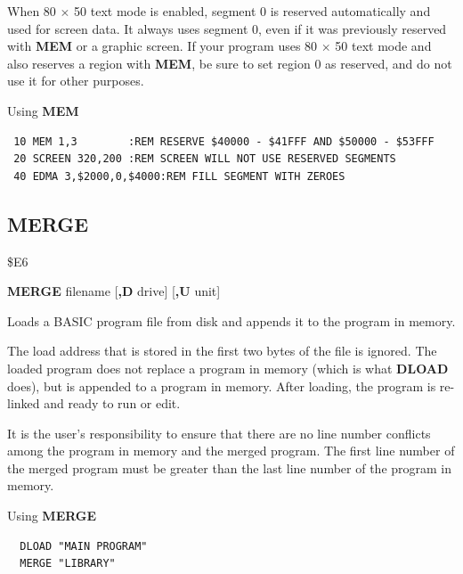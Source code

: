 \begin{description}[leftmargin=2cm,style=nextline]
                 When 80 $\times$ 50 text mode is enabled, segment 0 is reserved
                 automatically and used for screen data. It always uses
                 segment 0, even if it was previously reserved with {\bf MEM}
                 or a graphic screen. If your program uses 80 $\times$ 50 text
                 mode and also reserves a region with {\bf MEM}, be sure to
                 set region 0 as reserved, and do not use it for other
                 purposes.

\item [Example:] Using {\bf MEM}

\begin{tcolorbox}[colback=black,coltext=white]
\verbatimfont{\codefont}
\begin{verbatim}
 10 MEM 1,3        :REM RESERVE $40000 - $41FFF AND $50000 - $53FFF
 20 SCREEN 320,200 :REM SCREEN WILL NOT USE RESERVED SEGMENTS
 40 EDMA 3,$2000,0,$4000:REM FILL SEGMENT WITH ZEROES
\end{verbatim}
\end{tcolorbox}
\end{description}


\newpage
\subsection{MERGE}
\begin{description}[leftmargin=2cm,style=nextline]
\item [Token:] \$E6
\item [Format:] {\bf MERGE} filename [{\bf,D} drive] [{\bf,U} unit]
\item [Usage:] Loads a BASIC program file from disk
               and appends it to the program in memory.

   \filenamedefinition

   \drivedefinition

   \unitdefinition

\item [Remarks:]
   The load address that is stored in the first two bytes
   of the file is ignored. The loaded program does not
   replace a program in memory (which is what {\bf DLOAD} does),
   but is appended to a program in memory.
   After loading, the program is re-linked
   and ready to run or edit.

   It is the user's responsibility to ensure that there
   are no line number conflicts among the program in memory and
   the merged program. The first line number of the merged
   program must be greater than the last line number of the
   program in memory.

\item [Example:] Using {\bf MERGE}
\begin{tcolorbox}[colback=black,coltext=white]
\verbatimfont{\codefont}
\begin{verbatim}
  DLOAD "MAIN PROGRAM"
  MERGE "LIBRARY"
\end{verbatim}
\end{tcolorbox}
\end{description}

